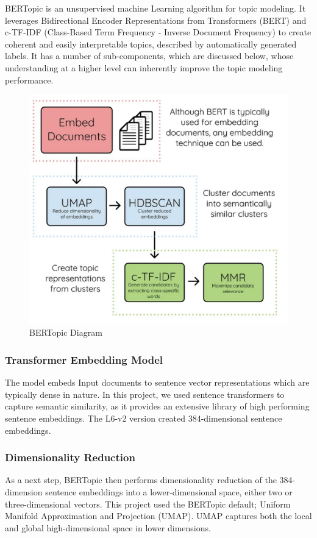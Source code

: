 \documentclass{article}
\theoremstyle{mytheoremstyle}
\theoremstyle{mytheoremstyle}
\theoremstyle{myproblemstyle}
\begin{document}
    BERTopic is an unsupervised machine Learning  algorithm for topic modeling. It leverages Bidirectional Encoder Representations from Transformers (BERT) and c-TF-IDF (Class-Based Term Frequency - Inverse Document Frequency) to create coherent and easily interpretable topics, described by automatically generated labels. It has a number of sub-components, which are discussed below, whose understanding at a higher level can inherently improve the topic modeling performance. \cite{grootendorst2022bertopic}
    
    \begin{figure}[ht]
        \centering
        \includegraphics[width=0.5\linewidth]{BERTopic_diagram.png}
        \caption{BERTopic Diagram}
        \label{fig:bertopic_diagram}
    \end{figure}

    \subsubsection{Transformer Embedding Model}
    The model embeds Input documents to sentence vector representations which are typically dense in nature. In this project, we used sentence transformers to capture semantic similarity, as it provides an extensive library of high performing sentence embeddings. The L6-v2 version created 384-dimensional sentence embeddings.

    \subsubsection{Dimensionality Reduction}
    As a next step, BERTopic then performs dimensionality reduction of the 384-dimension sentence embeddings into a lower-dimensional space, either two or three-dimensional vectors. This project used the BERTopic default; Uniform Manifold Approximation and Projection (UMAP). UMAP captures both the local and global high-dimensional space in lower dimensions.
\end{document}

